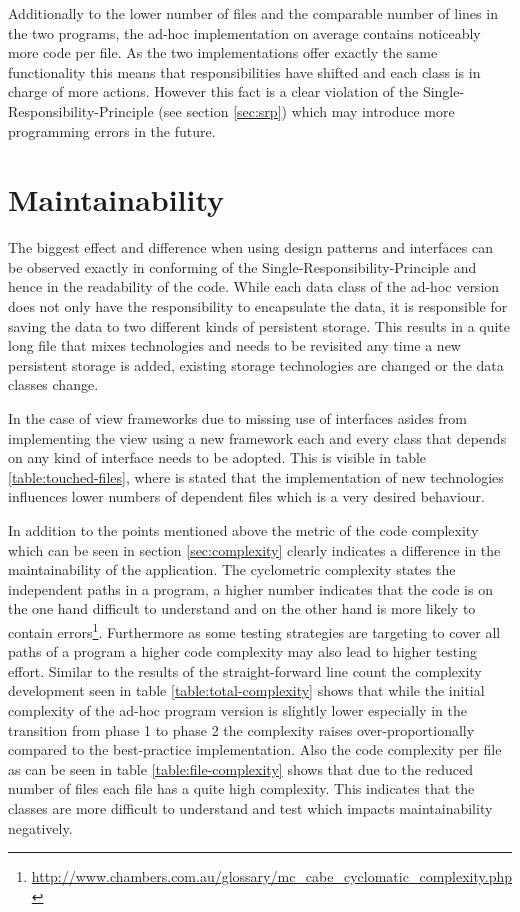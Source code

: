 Additionally to the lower number of files and the comparable number of lines in the two programs, the ad-hoc implementation on average contains noticeably more code per file. As the two implementations offer exactly the same functionality this means that responsibilities have shifted and each class is in charge of more actions. However this fact is a clear violation of the Single-Responsibility-Principle (see section \ref{sec:srp}) which may introduce more programming errors in the future. 

\section{Maintainability}
The biggest effect and difference when using design patterns and interfaces can be observed exactly in conforming of the Single-Responsibility-Principle and hence in the readability of the code. While each data class of the ad-hoc version does not only have the responsibility to encapsulate the data, it is responsible for saving the data to two different kinds of persistent storage. This results in a quite long file that mixes technologies and needs to be revisited any time a new persistent storage is added, existing storage technologies are changed or the data classes change. 

In the case of view frameworks due to missing use of interfaces asides from implementing the view using a new framework each and every class that depends on any kind of interface needs to be adopted. This is visible in table \ref{table:touched-files}, where is stated that the implementation of new technologies influences lower numbers of dependent files which is a very desired behaviour. 

In addition to the points mentioned above the metric of the code complexity which can be seen in section \ref{sec:complexity} clearly indicates a difference in the maintainability of the application. The cyclometric complexity states the independent paths in a program, a higher number indicates that the code is on the one hand difficult to understand and on the other hand is more likely to contain errors\footnote{\href{http://www.chambers.com.au/glossary/mc\_cabe\_cyclomatic\_complexity.php}{http://www.chambers.com.au/glossary/mc\_cabe\_cyclomatic\_complexity.php}}. Furthermore as some testing strategies are targeting to cover all paths of a program a higher code complexity may also lead to higher testing effort.
Similar to the results of the straight-forward line count the complexity development seen in table \ref{table:total-complexity} shows that while the initial complexity of the ad-hoc program version is slightly lower especially in the transition from phase 1 to phase 2 the complexity raises over-proportionally compared to the best-practice implementation. 
Also the code complexity per file as can be seen in table \ref{table:file-complexity} shows that due to the reduced number of files each file has a quite high complexity. This indicates that the classes are more difficult to understand and test which impacts maintainability negatively. 